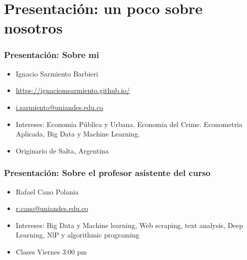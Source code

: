 \documentclass[
  shownotes,
  xcolor={svgnames},
  hyperref={colorlinks,citecolor=DarkBlue,linkcolor=DarkRed,urlcolor=DarkBlue}
  , aspectratio=169]{beamer}
\begin{document}

\section{Presentación: un poco sobre nosotros}
\begin{frame}
\frametitle{Presentación: Sobre mi}

  \begin{itemize}
      \item  Ignacio Sarmiento Barbieri
      \medskip
      \item \url{https://ignaciomsarmiento.github.io/}
      \medskip
      \item \href{mailto:i.sarmiento@uniandes.edu.co}{i.sarmiento@uniandes.edu.co}
      \medskip
      \item Intereses: Economia Pública y Urbana. Economia del Crime. Econometria Aplicada, Big Data y Machine Learning.
      \medskip
      \item Originario de Salta, Argentina
  \end{itemize}

\end{frame}


\begin{frame}
\frametitle{Presentación: Sobre el profesor asistente del curso}

  \begin{itemize}
      \item  Rafael Cano Polania
      \medskip
      \item \href{mailto:r.cano@uniandes.edu.co}{r.cano@uniandes.edu.co}
      \medskip
      \item Intereses: Big Data y Machine learning, Web scraping, text analysis, Deep Learning, NlP y algorithmic programing
      \medskip
      \item Clases Viernes 3:00 pm

  \end{itemize}

\end{frame}


\end{document}
